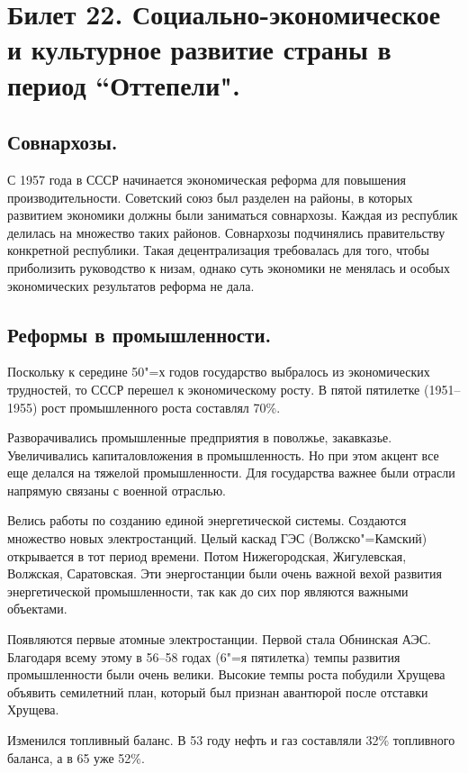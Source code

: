 \section{Билет 22. Социально-экономическое и культурное развитие страны в период “Оттепели".}

\subsection{Совнархозы.}

С 1957 года в СССР начинается экономическая реформа для повышения производительности. Советский союз был разделен на районы, в которых развитием экономики должны были заниматься совнархозы. Каждая из республик делилась на множество таких районов. Совнархозы подчинялись правительству конкретной республики. Такая децентрализация требовалась для того, чтобы приболизить руководство к низам, однако суть экономики не менялась и особых экономических результатов реформа не дала.

\subsection{Реформы в промышленности.}

Поскольку к середине 50"=х годов государство выбралось из экономических трудностей, то СССР перешел к экономическому росту. В пятой пятилетке (1951--1955) рост промышленного роста составлял 70\%. 

Разворачивались промышленные предприятия в поволжье, закавказье. Увеличивались капиталовложения в промышленность. Но при этом акцент все еще делался на тяжелой промышленности. Для государства важнее были отрасли напрямую связаны с военной отраслью. 

Велись работы по созданию единой энергетической системы. Создаются множество новых электростанций. Целый каскад ГЭС (Волжско"=Камский) открывается в тот период времени. Потом Нижегородская, Жигулевская, Волжская, Саратовская. Эти энергостанции были очень важной вехой развития энергетической промышленности, так как до сих пор являются важными объектами. 

Появляются первые атомные электростанции. Первой стала Обнинская АЭС. Благодаря всему этому в 56--58 годах (6"=я пятилетка) темпы развития промышленности были очень велики. Высокие темпы роста побудили Хрущева объявить семилетний план, который был признан авантюрой после отставки Хрущева.

Изменился топливный баланс. В 53 году нефть и газ составляли 32\% топливного баланса, а в 65 уже 52\%. 

